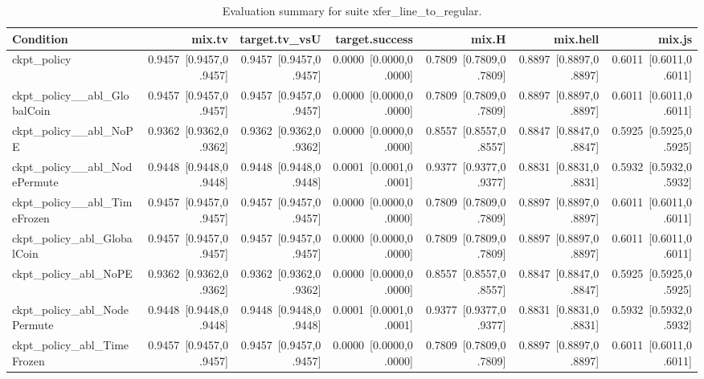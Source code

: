 \begin{table}[t]
\centering
\caption{Evaluation summary for suite xfer_line_to_regular.}
\label{tab:eval_xfer_line_to_regular}
\begin{tabular}{lrrrrrr}
\toprule
Condition & mix.tv & target.tv\_vsU & target.success & mix.H & mix.hell & mix.js \\
\midrule
ckpt\_policy & 0.9457~[0.9457,0.9457] & 0.9457~[0.9457,0.9457] & 0.0000~[0.0000,0.0000] & 0.7809~[0.7809,0.7809] & 0.8897~[0.8897,0.8897] & 0.6011~[0.6011,0.6011] \\
ckpt\_policy\_\_abl\_GlobalCoin & 0.9457~[0.9457,0.9457] & 0.9457~[0.9457,0.9457] & 0.0000~[0.0000,0.0000] & 0.7809~[0.7809,0.7809] & 0.8897~[0.8897,0.8897] & 0.6011~[0.6011,0.6011] \\
ckpt\_policy\_\_abl\_NoPE & 0.9362~[0.9362,0.9362] & 0.9362~[0.9362,0.9362] & 0.0000~[0.0000,0.0000] & 0.8557~[0.8557,0.8557] & 0.8847~[0.8847,0.8847] & 0.5925~[0.5925,0.5925] \\
ckpt\_policy\_\_abl\_NodePermute & 0.9448~[0.9448,0.9448] & 0.9448~[0.9448,0.9448] & 0.0001~[0.0001,0.0001] & 0.9377~[0.9377,0.9377] & 0.8831~[0.8831,0.8831] & 0.5932~[0.5932,0.5932] \\
ckpt\_policy\_\_abl\_TimeFrozen & 0.9457~[0.9457,0.9457] & 0.9457~[0.9457,0.9457] & 0.0000~[0.0000,0.0000] & 0.7809~[0.7809,0.7809] & 0.8897~[0.8897,0.8897] & 0.6011~[0.6011,0.6011] \\
ckpt\_policy\_abl\_GlobalCoin & 0.9457~[0.9457,0.9457] & 0.9457~[0.9457,0.9457] & 0.0000~[0.0000,0.0000] & 0.7809~[0.7809,0.7809] & 0.8897~[0.8897,0.8897] & 0.6011~[0.6011,0.6011] \\
ckpt\_policy\_abl\_NoPE & 0.9362~[0.9362,0.9362] & 0.9362~[0.9362,0.9362] & 0.0000~[0.0000,0.0000] & 0.8557~[0.8557,0.8557] & 0.8847~[0.8847,0.8847] & 0.5925~[0.5925,0.5925] \\
ckpt\_policy\_abl\_NodePermute & 0.9448~[0.9448,0.9448] & 0.9448~[0.9448,0.9448] & 0.0001~[0.0001,0.0001] & 0.9377~[0.9377,0.9377] & 0.8831~[0.8831,0.8831] & 0.5932~[0.5932,0.5932] \\
ckpt\_policy\_abl\_TimeFrozen & 0.9457~[0.9457,0.9457] & 0.9457~[0.9457,0.9457] & 0.0000~[0.0000,0.0000] & 0.7809~[0.7809,0.7809] & 0.8897~[0.8897,0.8897] & 0.6011~[0.6011,0.6011] \\
\bottomrule
\end{tabular}
\end{table}
